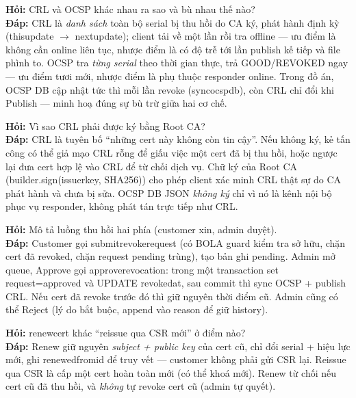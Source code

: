 \documentclass[12pt,a4paper]{article}
\newcommand{\code}[1]{{\ttfamily\small\def\_{\textunderscore\discretionary{}{}{}}#1}}
\begin{document}
\begin{qabox}
\textbf{Hỏi:} CRL và OCSP khác nhau ra sao và bù nhau thế nào?\\[2pt]
\textbf{Đáp:} CRL là \emph{danh sách} toàn bộ serial bị thu hồi do CA ký, phát
hành định kỳ (\code{this\_update} $\to$ \code{next\_update}); client tải về một
lần rồi tra offline --- ưu điểm là không cần online liên tục, nhược điểm là có
độ trễ tới lần publish kế tiếp và file phình to. OCSP tra \emph{từng serial}
theo thời gian thực, trả GOOD/REVOKED ngay --- ưu điểm tươi mới, nhược điểm là
phụ thuộc responder online. Trong đồ án, OCSP DB cập nhật tức thì mỗi lần revoke
(\code{sync\_ocsp\_db}), còn CRL chỉ đổi khi Publish --- minh hoạ đúng sự bù trừ
giữa hai cơ chế.
\end{qabox}

\begin{qabox}
\textbf{Hỏi:} Vì sao CRL phải được ký bằng Root CA?\\[2pt]
\textbf{Đáp:} CRL là tuyên bố ``những cert này không còn tin cậy''. Nếu không
ký, kẻ tấn công có thể giả mạo CRL rỗng để giấu việc một cert đã bị thu hồi,
hoặc ngược lại đưa cert hợp lệ vào CRL để từ chối dịch vụ. Chữ ký của Root CA
(\code{builder.sign(issuer\_key, SHA256)}) cho phép client xác minh CRL thật sự
do CA phát hành và chưa bị sửa. OCSP DB JSON \emph{không ký} chỉ vì nó là kênh
nội bộ phục vụ responder, không phát tán trực tiếp như CRL.
\end{qabox}

\begin{qabox}
\textbf{Hỏi:} Mô tả luồng thu hồi hai phía (customer xin, admin duyệt).\\[2pt]
\textbf{Đáp:} Customer gọi \code{submit\_revoke\_request} (có BOLA guard kiểm tra
sở hữu, chặn cert đã revoked, chặn request pending trùng), tạo bản ghi
\code{pending}. Admin mở queue, Approve gọi \code{approve\_revocation}: trong một
transaction set request=\code{approved} và UPDATE \code{revoked\_at}, sau commit
thì sync OCSP + publish CRL. Nếu cert đã revoke trước đó thì giữ nguyên thời
điểm cũ. Admin cũng có thể Reject (lý do bắt buộc, append vào reason để giữ
history).
\end{qabox}

\begin{qabox}
\textbf{Hỏi:} \code{renew\_cert} khác ``reissue qua CSR mới'' ở điểm nào?\\[2pt]
\textbf{Đáp:} Renew giữ nguyên \emph{subject + public key} của cert cũ, chỉ đổi
serial + hiệu lực mới, ghi \code{renewed\_from\_id} để truy vết --- customer
không phải gửi CSR lại. Reissue qua CSR là cấp một cert hoàn toàn mới (có thể
khoá mới). Renew từ chối nếu cert cũ đã thu hồi, và \emph{không} tự revoke cert
cũ (admin tự quyết).
\end{qabox}
\end{document}
